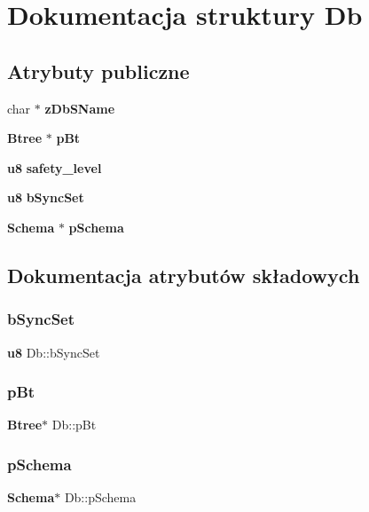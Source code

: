 \section{Dokumentacja struktury Db}
\label{struct_db}
\subsection*{Atrybuty publiczne}
\begin{DoxyCompactItemize}
\item 
char $\ast$ \textbf{ z\+Db\+S\+Name}
\item 
\textbf{ Btree} $\ast$ \textbf{ p\+Bt}
\item 
\textbf{ u8} \textbf{ safety\+\_\+level}
\item 
\textbf{ u8} \textbf{ b\+Sync\+Set}
\item 
\textbf{ Schema} $\ast$ \textbf{ p\+Schema}
\end{DoxyCompactItemize}


\subsection{Dokumentacja atrybutów składowych}
\mbox{\label{struct_db_a37f3a8593c9d7042c1c26dd492c409e4}} 
\subsubsection{bSyncSet}
{\footnotesize\ttfamily \textbf{ u8} Db\+::b\+Sync\+Set}

\mbox{\label{struct_db_a0633e5a6abfc39246d07cc6a417a5852}} 
\subsubsection{pBt}
{\footnotesize\ttfamily \textbf{ Btree}$\ast$ Db\+::p\+Bt}

\mbox{\label{struct_db_afd8647a83a4a7053231b92814520d6d4}} 
\subsubsection{pSchema}
{\footnotesize\ttfamily \textbf{ Schema}$\ast$ Db\+::p\+Schema}

\mbox{\label{struct_db_a04597a5c023d8b328193450b177ff24c}} 
